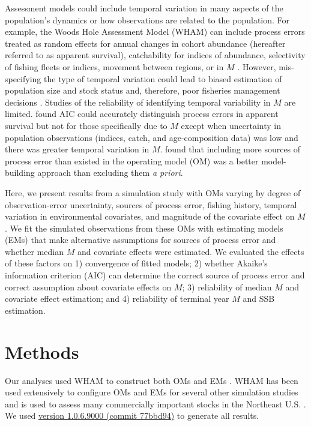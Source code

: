 \documentclass[
  12pt,
]{article}
\begin{document}
Assessment models could include temporal variation in many aspects of
the population's dynamics or how observations are related to the
population. For example, the Woods Hole Assessment Model (WHAM) can
include process errors treated as random effects for annual changes in
cohort abundance (hereafter referred to as apparent survival),
catchability for indices of abundance, selectivity of fishing fleets or
indices, movement between regions, or in \(M\)
\citep{stockmiller21, milleretal25}. However, mis-specifying the type of
temporal variation could lead to biased estimation of population size
and stock status and, therefore, poor fisheries management decisions
\citep{legaultpalmer16, szuwalskietal18}. Studies of the reliability of
identifying temporal variability in \(M\) are limited.
\citet{milleretal26} found AIC could accurately distinguish process
errors in apparent survival but not for those specifically due to \(M\)
except when uncertainty in population observations (indices, catch, and
age-composition data) was low and there was greater temporal variation
in \(M\). \citet{lietal24} found that including more sources of process
error than existed in the operating model (OM) was a better
model-building approach than excluding them \textit{a priori}.

Here, we present results from a simulation study with OMs varying by
degree of observation-error uncertainty, sources of process error,
fishing history, temporal variation in environmental covariates, and
magnitude of the covariate effect on \(M\). We fit the simulated
observations from these OMs with estimating models (EMs) that make
alternative assumptions for sources of process error and whether median
\(M\) and covariate effects were estimated. We evaluated the effects of
these factors on 1) convergence of fitted models; 2) whether Akaike's
information criterion (AIC) can determine the correct source of process
error and correct assumption about covariate effects on \(M\); 3)
reliability of median \(M\) and covariate effect estimation; and 4)
reliability of terminal year \(M\) and SSB estimation.

\section*{Methods}\label{methods}

Our analyses used WHAM to construct both OMs and EMs
\citep{millerstock20, stockmiller21, milleretal25}. WHAM has been used
extensively to configure OMs and EMs for several other simulation
studies
\citep{stocketal21, legaultetal23, lietal24, brittenetal26, lietal26_a}
and is used to assess many commercially important stocks in the
Northeast U.S. \citep[e.g.,][]{nefsc22, nefsc22a, nefsc24}. We used
\href{https://github.com/timjmiller/wham/tree/77bbd946e4881216a439933473d1c58b21c270c3}{version
1.0.6.9000 (commit 77bbd94)} to generate all results.
\end{document}

